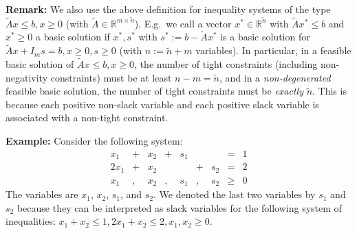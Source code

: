 \documentclass[12pt, showidx, twoside]{article}
\def\R{\mathbb{R}}
\begin{document}
{{{{\bf Remark:} We also use the above definition
for inequality systems of the type $\tilde Ax \leq b,  x\geq 0$
(with $\tilde A \in \R^{m \times \tilde n}$).
 E.g.\ we call a
vector $x^* \in \R^{\tilde n}$ with $\tilde Ax^* \leq b$ and $x^* \geq 0$
a basic solution if $x^*, s^*$ with $s^* := b - \tilde A x^*$ is a
basic solution for $\tilde Ax + I_{m} s = b, x\geq 0, s \geq 0$
(with $n := \tilde n + m$ variables).
In particular, in a %
feasible basic solution of
$\tilde Ax \leq b, x\geq 0$, the number of tight constraints
(including non-negativity constraints) must be at least $n - m = \tilde n$,
and in a {\it non-degenerated} feasible basic solution,
 the number of tight constraints must be {\it exactly} $\tilde n$.
This is because each positive non-slack variable and each positive
slack variable is associated with a non-tight constraint.





{\bf Example:} Consider the following system:
\begin{equation}\label{eq::degenerated_example}
\begin{array}{rcrccrcrl}
 x_1 & + &  x_2 & + & s_1 &   &     &   =  & 1\\
2x_1 & + &  x_2 &   &     & + & s_2 &   =  & 2\\
 x_1 & , &  x_2 & , & s_1 & , & s_2 & \geq & 0
\end{array}
\end{equation}
The variables are $x_1$, $x_2$, $s_1$, and $s_2$. We denoted
the last two variables by $s_1$ and $s_2$ because they can be 
interpreted as slack variables for the following system of
inequalities: $x_1 + x_2 \leq 1, 2x_1 + x_2 \leq 2, x_1,x_2 \geq 0$.

}}}
\end{document}
